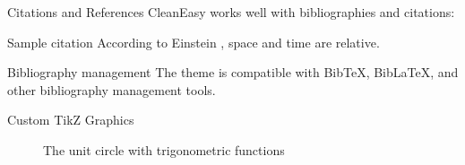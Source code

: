 \documentclass[aspectratio=169,xcolor=dvipsnames]{beamer}
\begin{document}
\begin{frame}{Citations and References}
  CleanEasy works well with bibliographies and citations:
  
  \begin{block}{Sample citation}
    According to Einstein \cite{einstein1905}, space and time are relative.
  \end{block}
  
  \begin{exampleblock}{Bibliography management}
    The theme is compatible with BibTeX, BibLaTeX, and other bibliography management tools.
  \end{exampleblock}
  
\end{frame}

\begin{frame}{Custom TikZ Graphics}

  \begin{figure}
      \centering
      \caption{The unit circle with trigonometric functions}
      \label{fig:exampleTikz}
  \end{figure}
\end{frame}
\end{document}
